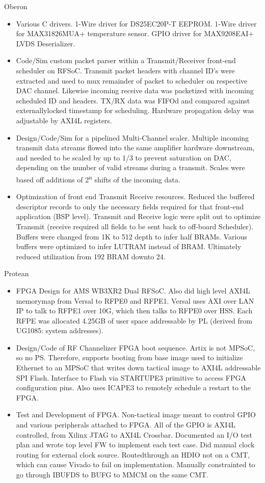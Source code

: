 \documentclass[10pt,final,sans]{resume}
\begin{document}
  Oberon 
  \begin{itemize}
    \item Various C drivers. 1-Wire driver for DS25EC20P-T EEPROM. 1-Wire driver for MAX31826MUA+ temperature sensor. GPIO driver for MAX9208EAI+ LVDS Deserializer.
    \item Code/Sim custom packet parser within a Transmit/Receiver front-end scheduler on RFSoC. Transmit packet headers with channel ID's were extracted and used to mux remainder of packet to scheduler on respective DAC channel. Likewise incoming receive data was packetized with incoming scheduled ID and headers. TX/RX data was FIFOd and compared against externallylocked timestamp for scheduling. Hardware propagation delay was adjustable by AXI4L registers.
    \item Design/Code/Sim for a pipelined Multi-Channel scaler. Multiple incoming transmit data streams flowed into the same amplifier hardware downstream, and needed to be scaled by up to 1/3 to prevent saturation on DAC, depending on the number of valid streams during a transmit. Scales were based off additions of 2\textsuperscript{n} shifts of the incoming data.
    \item Optimization of front end Transmit Receive resources. Reduced the buffered descriptor records to only the necessary fields required for that front-end application (BSP level). Transmit and Receive logic were split out to optimize Transmit (receive required all fields to be sent back to off-board Scheduler). Buffers were changed from 1K to 512 depth to infer half BRAMs. Various buffers were optimized to infer LUTRAM instead of BRAM. Ultimately reduced utilization from 192 BRAM downto 24.
  \end{itemize}

  Protean 
  \begin{itemize}
    \item FPGA Design for AMS WB3XR2 Dual RFSoC. Also did high level AXI4L memorymap from Versal to RFPE0 and RFPE1. Versal uses AXI over LAN IP to talk to RFPE1 over 10G, which then talks to RFPE0 over HSS. Each RFPE was allocated 4.25GB of user space addressable by PL (derived from UG1085: system addresses). 
    \item Design/Code of RF Channelizer FPGA boot sequence. Artix is not MPSoC, so no PS. Therefore, supports booting from base image used to initialize Ethernet to an MPSoC that writes down tactical image to AXI4L addressable SPI Flash. Interface to Flash via STARTUPE3 primitive to access FPGA configuration pins. Also uses ICAPE3 to remotely schedule a restart to the FPGA. 
    \item Test and Development of FPGA. Non-tactical image meant to control GPIO and various peripherals attached to FPGA. All of the GPIO is AXI4L controlled, from Xilinx JTAG to AXI4L Crossbar. Documented an I/O test plan and wrote top level FW to implement each test case. Did manual clock routing for external clock source. Routedthrough an HDIO not on a CMT, which can cause Vivado to fail on implementation. Manually constrainted to go through IBUFDS to BUFG to MMCM on the same CMT.
  \end{itemize}
\end{document}
